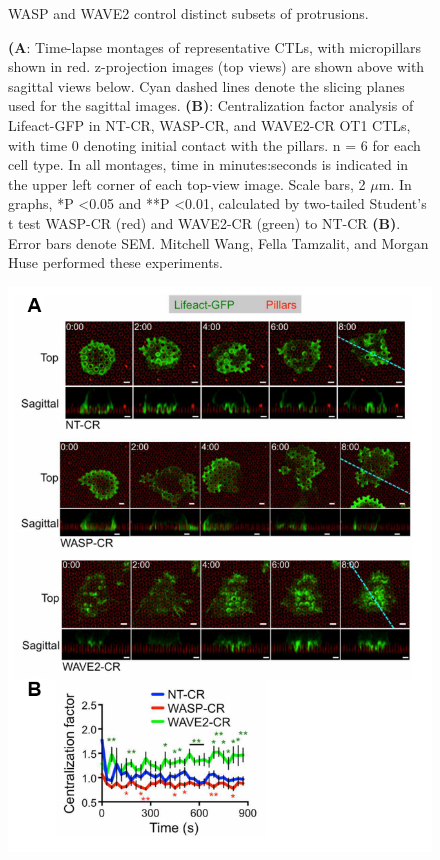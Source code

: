\clearpage
\begin{figure}[htbp]
	\caption{WASP and WAVE2 control distinct subsets of protrusions.}
	\caption*{\textbf{(A}: Time-lapse montages of representative CTLs, with micropillars shown in red. z-projection images (top views) are shown above with sagittal views below. Cyan dashed lines denote the slicing planes used for the sagittal images. \textbf{(B)}: Centralization factor analysis of Lifeact-GFP in NT-CR, WASP-CR, and WAVE2-CR OT1 CTLs, with time 0 denoting initial contact with the pillars. n = 6 for each cell type. In all montages, time in minutes:seconds is indicated in the upper left corner of each top-view image. Scale bars, 2 $\mu$m. In graphs, *P \textless 0.05 and **P \textless 0.01, calculated by two-tailed Student’s t test  WASP-CR (red) and WAVE2-CR (green) to NT-CR \textbf{(B)}. Error bars denote SEM. Mitchell Wang, Fella Tamzalit, and Morgan Huse performed these experiments.}
	\label{fig:fig5flcrisprs}
\end{figure}
\clearpage
\begin{figure}[h!]
	\ContinuedFloat
	\centering
	\captionsetup{labelformat=adja-page}
	\includegraphics[width=\textwidth]{../figures/chapter2/fig5flcrisprs.png}
	\caption[]{}
\end{figure}

